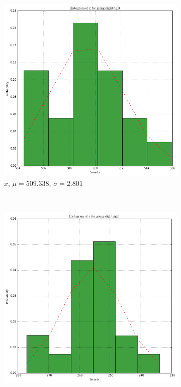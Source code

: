 \documentclass[paper=a4, fontsize=11pt]{scrartcl} %
\begin{document}
    \begin{figure}[h!]
        \centering
        \begin{subfigure}[b]{0.3\textwidth}
            \setlength{\fboxsep}{0.5pt} %
            \setlength{\fboxrule}{0.5pt}
            \includegraphics[width=\textwidth,fbox]{images/histogram_3_x_slightRight.png}
            \caption{$x$, $\mu = 509.338$, $\sigma = 2.801$}
        \end{subfigure}
        ~
        \begin{subfigure}[b]{0.3\textwidth}
            \setlength{\fboxsep}{0.5pt} %
            \setlength{\fboxrule}{0.5pt}
            \includegraphics[width=\textwidth,fbox]{images/histogram_3_y_slightRight.png}

\end{subfigure}
\end{figure}
\end{document}
